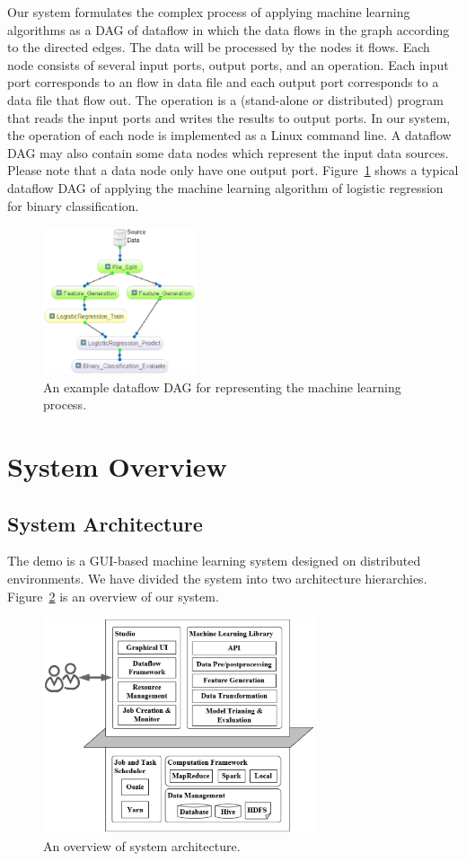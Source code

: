 \documentclass{sig-alternate-05-2015}
\begin{document}
Our system formulates the complex process of applying machine learning algorithms as a DAG of dataflow in which the data flows in the graph according to the directed edges. The data will be processed by the nodes it flows. Each node consists of several input ports, output ports, and an operation. Each input port corresponds to an flow in data file and each output port corresponds to a data file that flow out. The operation is a (stand-alone or distributed) program that reads the input ports and writes the results to output ports. In our system, the operation of each node is implemented as a Linux command line. A dataflow DAG may also contain some data nodes which represent the input data sources. Please note that a data node only have one output port. Figure~\ref{fig:dag} shows a typical dataflow DAG of applying the machine learning algorithm of logistic regression for binary classification.
\begin{figure}
\centering
\includegraphics[width = 0.4\textwidth]{LR_DAG.eps}
\caption{An example dataflow DAG for representing the machine learning process.}
\label{fig:dag}
\end{figure}

\section{System Overview}
\subsection{System Architecture}
The demo is a GUI-based machine learning system designed on distributed environments. We have divided the system into two architecture hierarchies. Figure~\ref{fig:arch} is an overview of our system.

\begin{figure}[!htb]
\centering
\includegraphics[height=2.5in]{arch.eps}
\caption{An overview of system architecture.}
\label{fig:arch}
\end{figure}
\end{document}
